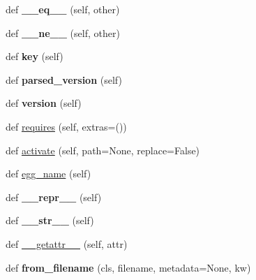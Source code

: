 \begin{DoxyCompactItemize}
def {\bfseries \+\_\+\+\_\+eq\+\_\+\+\_\+} (self, other)
\item 
\mbox{\label{classpkg__resources_1_1_distribution_a68a0e4b0dde33f9c9d229ab719bbc4bc}} 
def {\bfseries \+\_\+\+\_\+ne\+\_\+\+\_\+} (self, other)
\item 
\mbox{\label{classpkg__resources_1_1_distribution_aed88aca83c5db4914ee52d4b3e63181d}} 
def {\bfseries key} (self)
\item 
\mbox{\label{classpkg__resources_1_1_distribution_afe531c4633dee5ab0234fc2795381504}} 
def {\bfseries parsed\+\_\+version} (self)
\item 
\mbox{\label{classpkg__resources_1_1_distribution_a454a1c3eae52dee89980a24d7c67f036}} 
def {\bfseries version} (self)
\item 
def \hyperlink{classpkg__resources_1_1_distribution_ab33ded1c619d6d4cdbe69607d042daee}{requires} (self, extras=())
\item 
def \hyperlink{classpkg__resources_1_1_distribution_a4c4474f066527ee18c2dc15af67911df}{activate} (self, path=None, replace=False)
\item 
def \hyperlink{classpkg__resources_1_1_distribution_a229d424f62d10b7e83bba3b3efe6dbbb}{egg\+\_\+name} (self)
\item 
\mbox{\label{classpkg__resources_1_1_distribution_ae60bb36b93f41b982e8b987aeee79b27}} 
def {\bfseries \+\_\+\+\_\+repr\+\_\+\+\_\+} (self)
\item 
\mbox{\label{classpkg__resources_1_1_distribution_a3670256feca6287d7350751421d89697}} 
def {\bfseries \+\_\+\+\_\+str\+\_\+\+\_\+} (self)
\item 
def \hyperlink{classpkg__resources_1_1_distribution_a60734974b4449119f97e844be57ba38f}{\+\_\+\+\_\+getattr\+\_\+\+\_\+} (self, attr)
\item 
\mbox{\label{classpkg__resources_1_1_distribution_a71ffec18d8ff265f81127ba179f5d9b7}} 
def {\bfseries from\+\_\+filename} (cls, filename, metadata=None, kw)
\item 

\end{DoxyCompactItemize}
